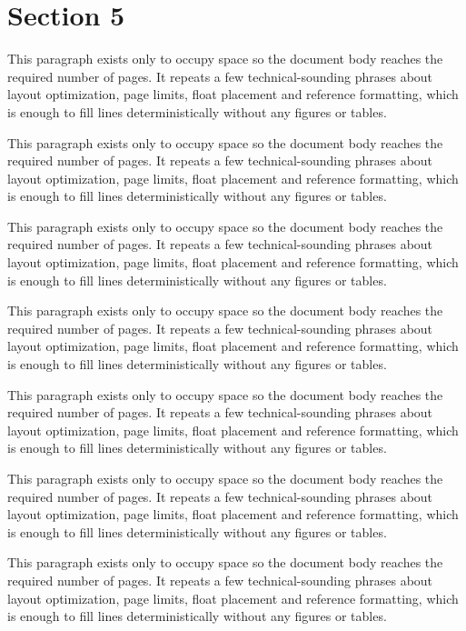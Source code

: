 \documentclass[10pt,letterpaper]{article}
\begin{document}
\section{Section 5}
This paragraph exists only to occupy space so the document body reaches the required number of pages. It repeats a few technical-sounding phrases about layout optimization, page limits, float placement and reference formatting, which is enough to fill lines deterministically without any figures or tables.

This paragraph exists only to occupy space so the document body reaches the required number of pages. It repeats a few technical-sounding phrases about layout optimization, page limits, float placement and reference formatting, which is enough to fill lines deterministically without any figures or tables.

This paragraph exists only to occupy space so the document body reaches the required number of pages. It repeats a few technical-sounding phrases about layout optimization, page limits, float placement and reference formatting, which is enough to fill lines deterministically without any figures or tables.

This paragraph exists only to occupy space so the document body reaches the required number of pages. It repeats a few technical-sounding phrases about layout optimization, page limits, float placement and reference formatting, which is enough to fill lines deterministically without any figures or tables.

This paragraph exists only to occupy space so the document body reaches the required number of pages. It repeats a few technical-sounding phrases about layout optimization, page limits, float placement and reference formatting, which is enough to fill lines deterministically without any figures or tables.

This paragraph exists only to occupy space so the document body reaches the required number of pages. It repeats a few technical-sounding phrases about layout optimization, page limits, float placement and reference formatting, which is enough to fill lines deterministically without any figures or tables.

This paragraph exists only to occupy space so the document body reaches the required number of pages. It repeats a few technical-sounding phrases about layout optimization, page limits, float placement and reference formatting, which is enough to fill lines deterministically without any figures or tables.
\end{document}
